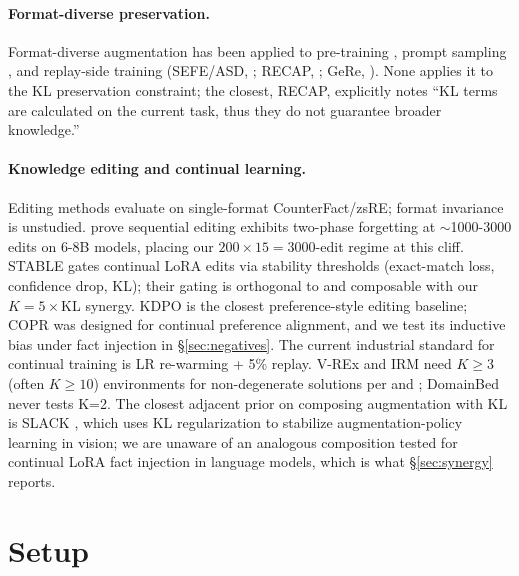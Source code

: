 \documentclass[11pt]{article}
\begin{document}
\paragraph{Format-diverse preservation.}
Format-diverse augmentation has been applied to pre-training
\citep{allenzhu2023knowledge}, prompt sampling \citep{wei2025paft}, and
replay-side training (SEFE/ASD, \citealp{chen2025sefe}; RECAP,
\citealp{phan2025recap}; GeRe, \citealp{zhang2025gere}). None applies it to
the KL preservation constraint; the closest, RECAP, explicitly notes ``KL
terms are calculated on the current task, thus they do not guarantee broader
knowledge.''

\paragraph{Knowledge editing and continual learning.}
Editing methods \citep{meng2022rome, meng2023memit, fang2024alphaedit}
evaluate on single-format CounterFact/zsRE; format invariance is unstudied.
\citet{gupta2024editing} prove sequential editing exhibits two-phase
forgetting at $\sim$1000-3000 edits on 6-8B models, placing our $200
\times 15 = 3000$-edit regime at this cliff. STABLE
\citep{hoy2025stable} gates continual LoRA edits via stability thresholds
(exact-match loss, confidence drop, KL); their gating is orthogonal to and
composable with our $K=5 \times $KL synergy. KDPO \citep{rozner2024kdpo}
is the closest preference-style editing baseline; COPR
\citep{zhang2025copr} was designed for continual preference alignment, and
we test its inductive bias under fact injection in \S\ref{sec:negatives}.
The current industrial standard for continual training
\citep{ibrahim2024simple} is LR re-warming + 5\% replay. V-REx
\citep{krueger2021vrex} and IRM \citep{arjovsky2019irm} need $K \geq 3$
(often $K \geq 10$) environments for non-degenerate solutions per
\citet{rosenfeld2021risks} and \citet{ahuja2021empirical}; DomainBed
\citep{gulrajani2021domainbed} never tests K=2. The closest adjacent
prior on composing augmentation with KL is SLACK
\citep{marrie2023slack}, which uses KL regularization to stabilize
augmentation-policy learning in vision; we are unaware of an analogous
composition tested for continual LoRA fact injection in language models,
which is what \S\ref{sec:synergy} reports.

\section{Setup}
\label{sec:setup}
\end{document}
